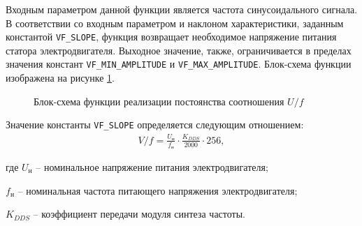         Входным параметром данной функции является частота синусоидального
        сигнала. В соответствии со входным параметром и наклоном
        характеристики, заданным константой \verb"VF_SLOPE", функция возвращает
        необходимое напряжение питания статора электродвигателя. Выходное
        значение, также, ограничивается в пределах значения констант
        \verb"VF_MIN_AMPLITUDE" и \verb"VF_MAX_AMPLITUDE".
        Блок-схема функции изображена на рисунке \ref{fig:bs-vf}.

        \begin{figure}[ph!]
            \caption{Блок-схема функции реализации постоянства соотношения $U/f$}
            \label{fig:bs-vf}
        \end{figure}
        
        Значение константы \verb"VF_SLOPE" определяется следующим отношением:
        \begin{gather*}
            V/f = \frac{U_\text{н}}{f_\text{н}} \cdot \frac{K_{DDS}}{2000} \cdot 256,
        \end{gather*}

        где $U_\text{н}$ -- номинальное напряжение питания электродвигателя;\par
        $f_\text{н}$ -- номинальная частота питающего напряжения электродвигателя;\par
        $K_{DDS}$ -- коэффициент передачи модуля синтеза частоты.

